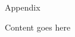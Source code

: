 


\cleardoublepage

\appendix

\begin{chapter}{Appendix}

\label{sec:appendix}

\begin{appendices}

Content goes here

\end{appendices}

\end{chapter}




\cleardoublepage

\newpage
{}





